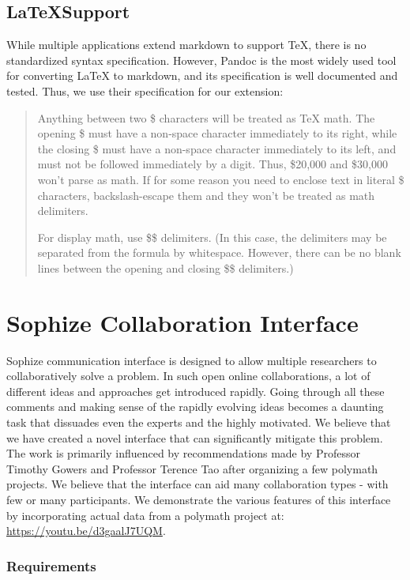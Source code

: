 \documentclass[a4paper]{article}
\begin{document}
\subsection{\LaTeX\space Support}

While multiple applications extend markdown to support TeX, there is no standardized syntax specification. However, Pandoc is the most widely used tool for converting LaTeX to markdown, and its specification is well documented and tested. Thus, we use their specification for our extension\cite{pandoc}:


\blockquote{Anything between two \$ characters will be treated as TeX math. The opening \$ must have a non-space character immediately to its right, while the closing \$ must have a non-space character immediately to its left, and must not be followed immediately by a digit. Thus, \$20,000 and \$30,000 won’t parse as math. If for some reason you need to enclose text in literal \$ characters, backslash-escape them and they won’t be treated as math delimiters.


For display math, use \$\$ delimiters. (In this case, the delimiters may be separated from the formula by whitespace. However, there can be no blank lines between the opening and closing \$\$ delimiters.)}




\section{Sophize Collaboration Interface}

Sophize communication interface is designed to allow multiple researchers to collaboratively solve a problem. In such open online collaborations, a lot of different ideas and approaches get introduced rapidly. Going through all these comments and making sense of the rapidly evolving ideas becomes a daunting task that dissuades even the experts and the highly motivated. We believe that we have created a novel interface that can significantly mitigate this problem. The work is primarily influenced by recommendations made by Professor Timothy Gowers and Professor Terence Tao after organizing a few polymath projects\cite{polymath_blog}. We believe that the interface can aid many collaboration types - with few or many participants. We demonstrate the various features of this interface by incorporating actual data from a polymath project at: \url{https://youtu.be/d3gaalJ7UQM}.


\subsubsection*{Requirements}
\end{document}
